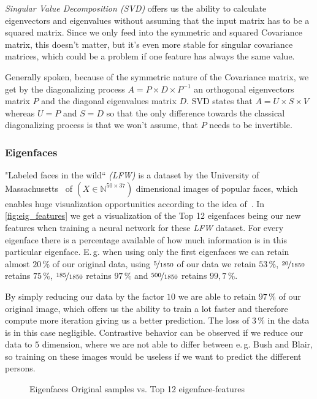 \documentclass[dvipsnames,twocolumn]{scrartcl}
\begin{document}
	\emph{Singular Value Decomposition (SVD)} offers us the ability to calculate eigenvectors and eigenvalues without assuming that the input matrix has to be a squared matrix. Since we only feed into the symmetric and squared Covariance matrix, this doesn't matter, but it's even more stable for singular covariance matrices, which could be a problem if one feature has always the same value.
	
	Generally spoken, because of the symmetric nature of the Covariance matrix, we get by the diagonalizing process $A = P\times D\times P^{-1}$ an orthogonal eigenvectors matrix $P$ and the diagonal eigenvalues matrix $D$. SVD states that $A = U\times S \times V$ whereas $U = P$ and $S = D$ so that the only difference towards the classical diagonalizing process is that we won't assume, that $P$ needs to be invertible.
	
	\subsubsection{Eigenfaces}
	
	"Labeled faces in the wild`` \emph{(LFW)} is a dataset by the University of Massachusetts~\cite{LFW} of $(X \in \mathbb{N}^{50\times 37})$ dimensional images of popular faces, which enables huge visualization opportunities according to the idea of~\cite{eigenfaces}. In \autoref{fig:eig_features} we get a visualization of the Top 12 eigenfaces being our new features when training a neural network for these \emph{LFW} dataset. For every eigenface there is a percentage available of how much information is in this particular eigenface. E.\,g. when using only the first eigenfaces we can retain almost $20\,\%$ of our original data, using $\nicefrac{5}{1850}$ of our data we retain $53\,\%$, $\nicefrac{20}{1850}$ retains $75\,\%$, $\nicefrac{185}{1850}$ retains $97\,\%$ and $\nicefrac{500}{1850}$ retains $99,7\,\%$.
	
	By simply reducing our data by the factor $10$ we are able to retain $97\,\%$ of our original image, which offers us the ability to train a lot faster and therefore compute more iteration giving us a better prediction. The loss of $3\,\%$ in the data is in this case negligible. Contrastive behavior can be observed if we reduce our data to $5$ dimension, where we are not able to differ between e.\,g. Bush and Blair, so training on these images would be useless if we want to predict the different persons.
	
	\begin{figure}
		\caption{Eigenfaces Original samples vs. Top 12 eigenface-features}
		\label{fig:eig_features}
	\end{figure}
	
\end{document}
